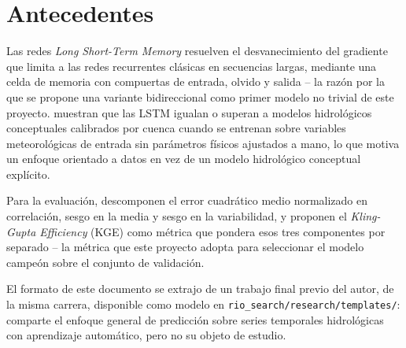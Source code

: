 \chapter{Antecedentes}
\label{chap:antecedentes}

Las redes \emph{Long Short-Term Memory} \citep{hochreiter-1997-lstm} resuelven el desvanecimiento
del gradiente que limita a las redes recurrentes cl\'asicas en secuencias largas, mediante una
celda de memoria con compuertas de entrada, olvido y salida -- la raz\'on por la que se propone una
variante bidireccional como primer modelo no trivial de este proyecto.
\citep{kratzert-2018-lstm-rainfall-runoff} muestran que las LSTM igualan o superan a modelos
hidrol\'ogicos conceptuales calibrados por cuenca cuando se entrenan sobre variables meteorol\'ogicas
de entrada sin par\'ametros f\'isicos ajustados a mano, lo que motiva un enfoque orientado a datos
en vez de un modelo hidrol\'ogico conceptual expl\'icito.

Para la evaluaci\'on, \citep{gupta-2009-kge} descomponen el error cuadr\'atico medio normalizado en
correlaci\'on, sesgo en la media y sesgo en la variabilidad, y proponen el \emph{Kling-Gupta
Efficiency} (KGE) como m\'etrica que pondera esos tres componentes por separado -- la m\'etrica que
este proyecto adopta para seleccionar el modelo campe\'on sobre el conjunto de validaci\'on.

El formato de este documento se extrajo de un trabajo final previo del autor, de la misma carrera,
disponible como modelo en \texttt{rio\_search/research/templates/}: comparte el enfoque general de
predicci\'on sobre series temporales hidrol\'ogicas con aprendizaje autom\'atico, pero no su objeto
de estudio.
